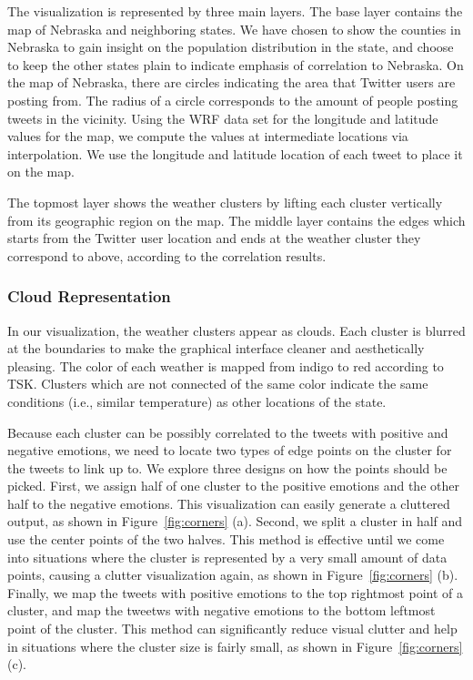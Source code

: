 The visualization is represented by three main layers. The base layer contains the map of Nebraska and neighboring states. We have chosen to show the counties in Nebraska to gain insight on the population distribution in the state, and choose to keep the other states plain to indicate emphasis of correlation to Nebraska. On the map of Nebraska, there are circles indicating the area that Twitter users are posting from. The radius of a circle corresponds to the amount of people posting tweets in the vicinity. Using the WRF data set for the longitude and latitude values for the map, we compute the values at intermediate locations via interpolation. We use the longitude and latitude location of each tweet to place it on the map.

The topmost layer shows the weather clusters by lifting each cluster vertically from its geographic region on the map. The middle layer contains the edges which starts from the Twitter user location and ends at the weather cluster they correspond to above, according to the correlation results.

\subsubsection{Cloud Representation}

In our visualization, the weather clusters appear as clouds. Each cluster is blurred at the boundaries to make the graphical interface cleaner and aesthetically pleasing. The color of each weather is mapped from indigo to red according to TSK. Clusters which are not connected of the same color indicate the same conditions (i.e., similar temperature) as other locations of the state. %

Because each cluster can be possibly correlated to the tweets with positive and negative emotions, we need to locate two types of edge points on the cluster for the tweets to link up to. We explore three designs on how the points should be picked. First, we assign half of one cluster to the positive emotions and the other half to the negative emotions. This visualization can easily generate a cluttered output, as shown in Figure~\ref{fig:corners} (a). Second, we split a cluster in half and use the center points of the two halves. This method is effective until we come into situations where the cluster is represented by a very small amount of data points, causing a clutter visualization again, as shown in Figure~\ref{fig:corners} (b). Finally, we map the tweets with positive emotions to the top rightmost point of a cluster, and map the tweetws with negative emotions to the bottom leftmost point of the cluster. This method can significantly reduce visual clutter and help in situations where the cluster size is fairly small, as shown in Figure~\ref{fig:corners} (c).


